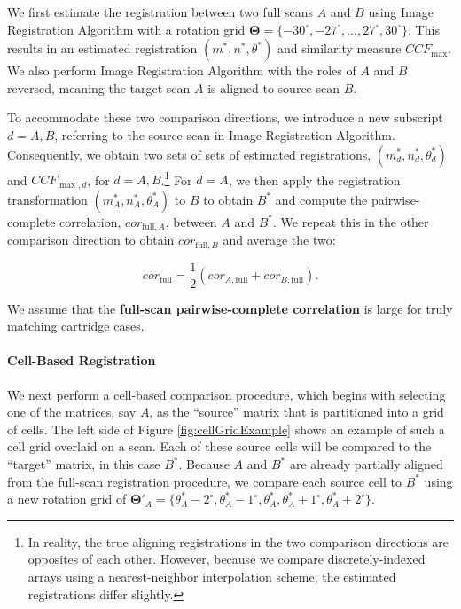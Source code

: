 \documentclass[11pt,]{isuthesis}
\let\oldparagraph\paragraph
\renewcommand{\paragraph}[1]{\oldparagraph{#1}\mbox{}}
\let\rmarkdownfootnote\footnote%
\def\footnote{\protect\rmarkdownfootnote}
\begin{document}
We first estimate the registration between two full scans \(A\) and \(B\) using Image Registration Algorithm with a rotation grid \(\pmb{\Theta} = \{-30^\circ, -27^\circ,...,27^\circ,30^\circ\}\).
This results in an estimated registration \((m^*,n^*,\theta^*)\) and similarity measure \(CCF_{\max}\).
We also perform Image Registration Algorithm with the roles of \(A\) and \(B\) reversed, meaning the target scan \(A\) is aligned to source scan \(B\).

To accommodate these two comparison directions, we introduce a new subscript \(d = A,B\), referring to the source scan in Image Registration Algorithm.
Consequently, we obtain two sets of sets of estimated registrations, \((m^*_d,n^*_d,\theta^*_d)\) and \(CCF_{\max,d}\), for \(d=A,B\).\footnote{In reality, the true aligning registrations in the two comparison directions are opposites of each other. However, because we compare discretely-indexed arrays using a nearest-neighbor interpolation scheme, the estimated registrations differ slightly.}
For \(d = A\), we then apply the registration transformation \((m^*_A,n^*_A,\theta^*_A)\) to \(B\) to obtain \(B^*\) and compute the pairwise-complete correlation, \(cor_{\text{full},A}\), between \(A\) and \(B^*\).
We repeat this in the other comparison direction to obtain \(cor_{\text{full},B}\) and average the two:

\[
cor_{\text{full}} = \frac{1}{2}\left(cor_{A,\text{full}} + cor_{B,\text{full}}\right).
\]

We assume that the \textbf{full-scan pairwise-complete correlation} is large for truly matching cartridge cases.

\hypertarget{cell-based-registration}{%
\paragraph{Cell-Based Registration}\label{cell-based-registration}}

We next perform a cell-based comparison procedure, which begins with selecting one of the matrices, say \(A\), as the ``source'' matrix that is partitioned into a grid of cells.
The left side of Figure \ref{fig:cellGridExample} shows an example of such a cell grid overlaid on a scan.
Each of these source cells will be compared to the ``target'' matrix, in this case \(B^*\).
Because \(A\) and \(B^*\) are already partially aligned from the full-scan registration procedure, we compare each source cell to \(B^*\) using a new rotation grid of \(\pmb{\Theta}'_A = \{\theta^*_A - 2^\circ, \theta^*_A - 1^\circ,\theta^*_A,\theta^*_A + 1^\circ,\theta^*_A + 2^\circ\}\).
\end{document}
